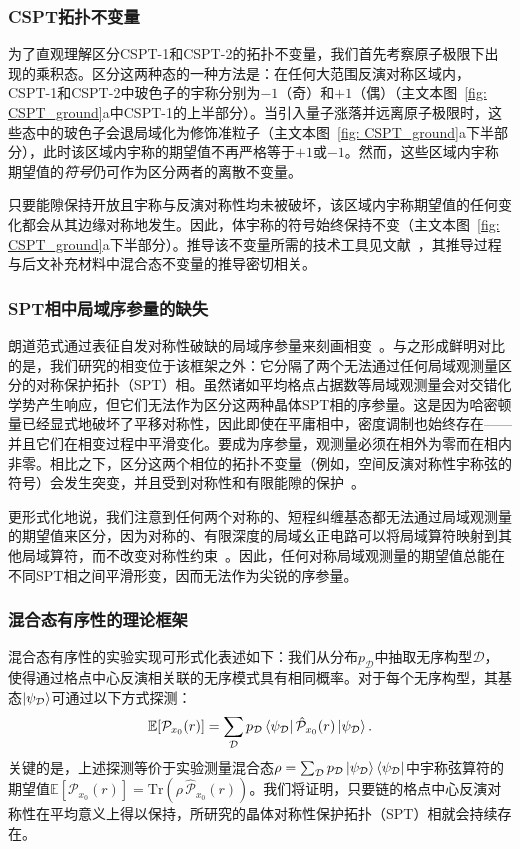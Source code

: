\documentclass[preprint,superscriptaddress,floatfix,nofootinbib]{revtex4-2}
\begin{document}
\subsubsection*{CSPT拓扑不变量}

为了直观理解区分CSPT-1和CSPT-2的拓扑不变量，我们首先考察原子极限下出现的乘积态。区分这两种态的一种方法是：在任何大范围反演对称区域内，CSPT-1和CSPT-2中玻色子的宇称分别为$-1$（奇）和$+1$（偶）（主文本图~\ref{fig: CSPT_ground}a中CSPT-1的上半部分）。当引入量子涨落并远离原子极限时，这些态中的玻色子会退局域化为修饰准粒子（主文本图~\ref{fig: CSPT_ground}a下半部分），此时该区域内宇称的期望值不再严格等于$+1$或$-1$。然而，这些区域内宇称期望值的\textit{符号}仍可作为区分两者的离散不变量。

只要能隙保持开放且宇称与反演对称性均未被破坏，该区域内宇称期望值的任何变化都会从其边缘对称地发生。因此，体宇称的符号始终保持不变（主文本图~\ref{fig: CSPT_ground}a下半部分）。推导该不变量所需的技术工具见文献~\cite{Fuji2015}，其推导过程与后文补充材料中混合态不变量的推导密切相关。
\subsubsection*{SPT相中局域序参量的缺失}
朗道范式通过表征自发对称性破缺的局域序参量来刻画相变~\cite{Landau1937, Beekman2019}。与之形成鲜明对比的是，我们研究的相变位于该框架之外：它分隔了两个无法通过任何局域观测量区分的对称保护拓扑（SPT）相。虽然诸如平均格点占据数等局域观测量会对交错化学势产生响应，但它们无法作为区分这两种晶体SPT相的序参量。这是因为哈密顿量已经显式地破坏了平移对称性，因此即使在平庸相中，密度调制也始终存在——并且它们在相变过程中平滑变化。要成为序参量，观测量必须在相外为零而在相内非零。相比之下，区分这两个相位的拓扑不变量（例如，空间反演对称性宇称弦的符号）会发生突变，并且受到对称性和有限能隙的保护~\cite{Fuji2015, Pollmann2012}。

更形式化地说，我们注意到任何两个对称的、短程纠缠基态都无法通过局域观测量的期望值来区分，因为对称的、有限深度的局域幺正电路可以将局域算符映射到其他局域算符，而不改变对称性约束~\cite{Chen2010, Chen2011}。因此，任何对称局域观测量的期望值总能在不同SPT相之间平滑形变，因而无法作为尖锐的序参量。
\subsubsection*{混合态有序性的理论框架}
混合态有序性的实验实现可形式化表述如下：我们从分布$p_{\mathcal{D}}$中抽取无序构型$\mathcal{D}$，使得通过格点中心反演相关联的无序模式具有相同概率。对于每个无序构型，其基态$\ket{\psi_{\mathcal{D}}}$可通过以下方式探测：
\begin{equation}
    \mathbb{E}[\mathcal{P}_{x_0}(r)] = \sum_{\mathcal{D}} p_{\mathcal{D}} \bra{\psi_{\mathcal{D}}} \hat{\mathcal{P}}_{x_0}(r)\ket{\psi_{\mathcal{D}}}.
\end{equation}
关键的是，上述探测等价于实验测量混合态$\rho = \sum_{\mathcal{D}} p_{\mathcal{D}} \ket{\psi_{\mathcal{D}}} \bra{\psi_{\mathcal{D}}}$中宇称弦算符的期望值$\mathbb{E}[\mathcal{P}_{x_0}(r)] = \text{Tr}\left( \rho\,  \hat{\mathcal{P}}_{x_0}(r)\right)$。我们将证明，只要链的格点中心反演对称性在平均意义上得以保持，所研究的晶体对称性保护拓扑（SPT）相就会持续存在。
\end{document}
